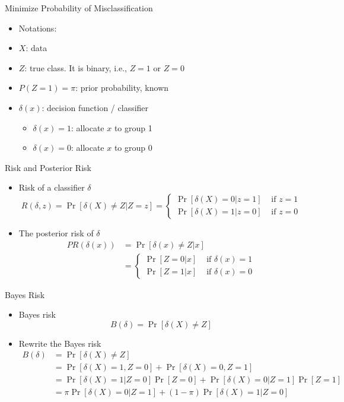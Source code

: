 \documentclass[
  ignorenonframetext,
]{beamer}
\providecommand{\tightlist}{%
  \setlength{\itemsep}{0pt}\setlength{\parskip}{0pt}}
\begin{document}
\begin{frame}{Minimize Probability of Misclassification}
\begin{itemize}
\tightlist
\item
  Notations:
\item
  \(X\): data
\item
  \(Z\): true class. It is binary, i.e., \(Z=1\) or \(Z=0\)
\item
  \(P(Z=1)=\pi\): prior probability, known
\item
  \(\delta(x)\): decision function / classifier

  \begin{itemize}
  \tightlist
  \item
    \(\delta(x)=1\): allocate \(x\) to group 1
  \item
    \(\delta(x)=0\): allocate \(x\) to group 0
  \end{itemize}
\end{itemize}
\end{frame}

\begin{frame}{Risk and Posterior Risk}
\protect\hypertarget{risk-and-posterior-risk}{}
\begin{itemize}
\item
  Risk of a classifier \(\delta\)
  \[R(\delta, z)=\Pr [\delta(X)\not= Z|Z=z]=\left\{
  \begin{array}{cc}
  \Pr[\delta(X)=0|z=1] & \mbox{ if } z=1\\
  \Pr[\delta(X)=1|z=0] & \mbox{ if } z=0
  \end{array}\right.\]
\item
  The posterior risk of \(\delta\) \[\begin{aligned}
  PR(\delta(x)) &= \Pr[\delta(x)\not= Z|x]\\
  &=\left\{
  \begin{array}{cc}
  \Pr[Z=0|x] & \mbox{ if } \delta(x)=1\\
  \Pr[Z=1|x] & \mbox{ if } \delta(x)=0
  \end{array}\right.
  \end{aligned}\]
\end{itemize}
\end{frame}

\begin{frame}{Bayes Risk}
\protect\hypertarget{bayes-risk}{}
\begin{itemize}
\item
  Bayes risk \[B(\delta)=\Pr [\delta(X)\not= Z]\]
\item
  Rewrite the Bayes risk \[\begin{aligned}
  B(\delta) &=\Pr [\delta(X)\not= Z]\\
  &=\Pr [\delta(X)=1, Z=0] + \Pr [\delta(X)=0, Z=1]\\
  &=\Pr [\delta(X)=1| Z=0]\Pr[Z=0] + \Pr [\delta(X)=0| Z=1] \Pr[Z=1]\\
  &=\pi \Pr [\delta(X)=0| Z=1]+ (1-\pi)\Pr [\delta(X)=1| Z=0]
  \end{aligned}\]
\end{itemize}
\end{frame}
\end{document}
